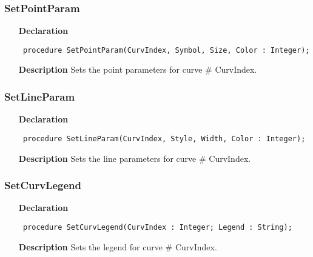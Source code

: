 \documentclass[12pt,a4paper,oneside]{report}
\newcommand{\declarationitem}[1]{\textbf{#1}}
\newcommand{\descriptiontitle}[1]{\textbf{#1}}
\newcommand{\code}[1]{\texttt{#1}}
\begin{document}
\subsubsection{SetPointParam}
\label{uplot-SetPointParam}
\begin{itemize}\item[\declarationitem{Declaration}\hfill]
	\begin{flushleft}
		\code{
			procedure SetPointParam(CurvIndex, Symbol, Size, Color : Integer);}
		
	\end{flushleft}
	
	\par
	\item[\descriptiontitle{Description}]
	Sets the point parameters for curve {\#} CurvIndex.
	
\end{itemize}
\subsubsection{SetLineParam}
\label{uplot-SetLineParam}
\begin{itemize}\item[\declarationitem{Declaration}\hfill]
	\begin{flushleft}
		\code{
			procedure SetLineParam(CurvIndex, Style, Width, Color : Integer);}
		
	\end{flushleft}
	
	\par
	\item[\descriptiontitle{Description}]
	Sets the line parameters for curve {\#} CurvIndex.
	
\end{itemize}
\subsubsection{SetCurvLegend}
\label{uplot-SetCurvLegend}
\begin{itemize}\item[\declarationitem{Declaration}\hfill]
	\begin{flushleft}
		\code{
			procedure SetCurvLegend(CurvIndex : Integer; Legend : String);}
		
	\end{flushleft}
	
	\par
	\item[\descriptiontitle{Description}]
	Sets the legend for curve {\#} CurvIndex.
	
\end{itemize}
\end{document}
